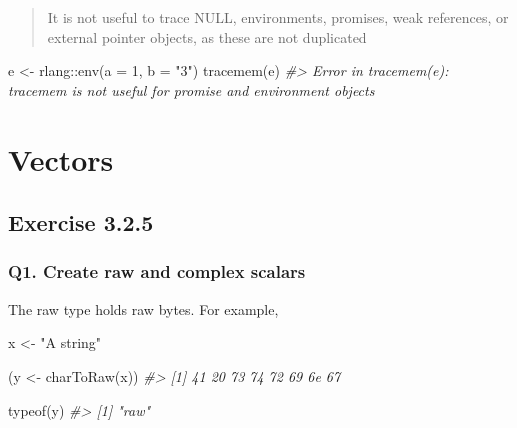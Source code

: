 \documentclass[
]{book}
\newenvironment{Shaded}{\begin{snugshade}}{\end{snugshade}}
\newcommand{\AttributeTok}[1]{\textcolor[rgb]{0.77,0.63,0.00}{#1}}
\newcommand{\CommentTok}[1]{\textcolor[rgb]{0.56,0.35,0.01}{\textit{#1}}}
\newcommand{\DecValTok}[1]{\textcolor[rgb]{0.00,0.00,0.81}{#1}}
\newcommand{\FunctionTok}[1]{\textcolor[rgb]{0.00,0.00,0.00}{#1}}
\newcommand{\NormalTok}[1]{#1}
\newcommand{\OtherTok}[1]{\textcolor[rgb]{0.56,0.35,0.01}{#1}}
\newcommand{\SpecialCharTok}[1]{\textcolor[rgb]{0.00,0.00,0.00}{#1}}
\newcommand{\StringTok}[1]{\textcolor[rgb]{0.31,0.60,0.02}{#1}}
\begin{document}
\begin{quote}
It is not useful to trace NULL, environments, promises, weak references, or external pointer objects, as these are not duplicated
\end{quote}

\begin{Shaded}
\begin{Highlighting}[]
\NormalTok{e }\OtherTok{\textless{}{-}}\NormalTok{ rlang}\SpecialCharTok{::}\FunctionTok{env}\NormalTok{(}\AttributeTok{a =} \DecValTok{1}\NormalTok{, }\AttributeTok{b =} \StringTok{"3"}\NormalTok{)}
\FunctionTok{tracemem}\NormalTok{(e)}
\CommentTok{\#\textgreater{} Error in tracemem(e): \textquotesingle{}tracemem\textquotesingle{} is not useful for promise and environment objects}
\end{Highlighting}
\end{Shaded}

\hypertarget{vectors}{%
\chapter{Vectors}\label{vectors}}

\hypertarget{exercise-3.2.5}{%
\section{Exercise 3.2.5}\label{exercise-3.2.5}}

\hypertarget{q1.-create-raw-and-complex-scalars}{%
\subsection*{Q1. Create raw and complex scalars}\label{q1.-create-raw-and-complex-scalars}}

The raw type holds raw bytes. For example,

\begin{Shaded}
\begin{Highlighting}[]
\NormalTok{x }\OtherTok{\textless{}{-}} \StringTok{"A string"}

\NormalTok{(y }\OtherTok{\textless{}{-}} \FunctionTok{charToRaw}\NormalTok{(x))}
\CommentTok{\#\textgreater{} [1] 41 20 73 74 72 69 6e 67}

\FunctionTok{typeof}\NormalTok{(y)}
\CommentTok{\#\textgreater{} [1] "raw"}
\end{Highlighting}
\end{Shaded}
\end{document}
